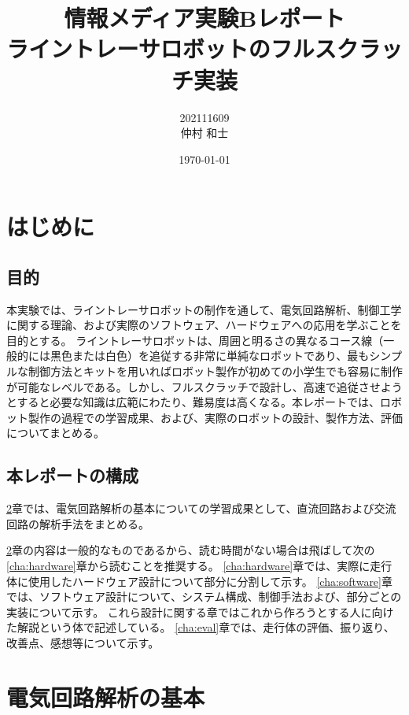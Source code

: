 \documentclass{ltjsreport}
\title{情報メディア実験Bレポート\\ライントレーサロボットのフルスクラッチ実装}
\author{202111609\\ 仲村 和士}
\date{\today}
\begin{document}
\maketitle



\tableofcontents

\chapter{はじめに}


\section{目的}
本実験では、ライントレーサロボットの制作を通して、電気回路解析、制御工学に関する理論、および実際のソフトウェア、ハードウェアへの応用を学ぶことを目的とする。
ライントレーサロボットは、周囲と明るさの異なるコース線（一般的には黒色または白色）を追従する非常に単純なロボットであり、最もシンプルな制御方法とキットを用いればロボット製作が初めての小学生でも容易に制作が可能なレベルである。しかし、フルスクラッチで設計し、高速で追従させようとすると必要な知識は広範にわたり、難易度は高くなる。本レポートでは、ロボット製作の過程での学習成果、および、実際のロボットの設計、製作方法、評価についてまとめる。

\section{本レポートの構成}
\ref{cha:electric}章では、電気回路解析の基本についての学習成果として、直流回路および交流回路の解析手法をまとめる。

\ref{cha:electric}章の内容は一般的なものであるから、読む時間がない場合は飛ばして次の\ref{cha:hardware}章から読むことを推奨する。
\ref{cha:hardware}章では、実際に走行体に使用したハードウェア設計について部分に分割して示す。
\ref{cha:software}章では、ソフトウェア設計について、システム構成、制御手法および、部分ごとの実装について示す。
これら設計に関する章ではこれから作ろうとする人に向けた解説という体で記述している。
\ref{cha:eval}章では、走行体の評価、振り返り、改善点、感想等について示す。

\chapter{電気回路解析の基本}\label{cha:electric}
\end{document}
